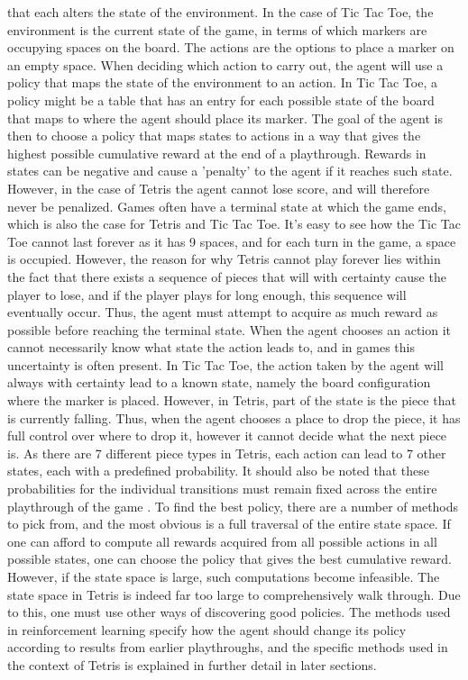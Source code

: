 that each alters the state of the environment. In the case of 
Tic Tac Toe, the environment is the current state of the game, 
in terms of which markers are occupying spaces on the board.
The actions are the options to place a marker
on an empty space.
When deciding which action to carry out, the agent will use
a policy that maps the state of the environment to an action.
In Tic Tac Toe, a policy might be a table that has an entry for each possible
state of the board that maps to where the agent should place its marker.
The goal of the agent is then to choose a policy that maps states to actions 
in a way that
gives the highest possible cumulative reward at the end of a playthrough. 
Rewards in states can be negative and cause a 'penalty' to the agent if it reaches
such state. However, in the case of Tetris the agent cannot lose score,
and will therefore never be penalized.
Games often have a terminal state at which the game ends, which is 
also the case for Tetris and Tic Tac Toe. It's easy to see how the
Tic Tac Toe cannot last forever as it has 9 spaces, and for each turn in the game,
a space is occupied. However, the reason for why Tetris cannot play forever
lies within the fact that there exists a sequence of pieces that will
with certainty cause the player to lose, and if the player plays for 
long enough, this sequence will eventually occur. Thus, the agent must
attempt to acquire as much reward as possible before reaching the terminal 
state. 
When the agent chooses an action it cannot necessarily know what state
the action leads to, and in games this uncertainty is often present.
In Tic Tac Toe, the action taken by the agent will always with certainty 
lead to a known state, namely the board configuration where the marker is placed.
However, in Tetris, part of the state is the piece that is currently falling.
Thus, when the agent chooses a place to drop the piece, it has full control
over where to drop it, however it cannot decide what the next piece is. 
As there are 7 different piece
types in Tetris, each action can lead to 7 other states, each with a predefined probability.
It should also be noted that these probabilities for the individual transitions
must remain fixed across the entire playthrough of the game \citep{Carr}.
To find the best policy, there are a number of methods to pick from,
and the most obvious is a full traversal of the entire state space.
If one can afford to compute all rewards acquired from all possible 
actions in all possible states, one can choose the policy 
that gives the best cumulative reward. However, if the state space is
large, such computations become infeasible. The state space in Tetris
is indeed far too large to comprehensively walk through.
Due to this, one must use other ways of discovering good policies.
The methods used in reinforcement learning 
specify how the agent should change its policy according to 
results from earlier playthroughs, and the specific methods used in
the context of Tetris is explained in further detail in later sections.


